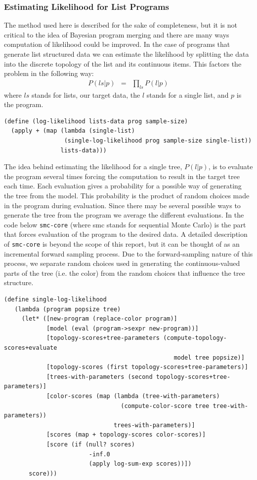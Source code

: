 \documentclass[a4paper,10pt]{article}
\begin{document}
\subsubsection{Estimating Likelihood for List Programs}
The method used here is described for the sake of completeness, but it is not critical to the idea of Bayesian program merging and there are many ways computation of likelihood could be improved.  In the case of programs that generate list structured data we can estimate the likelihood by splitting the data into the discrete topology of the list and its continuous items.  This factors the problem in the following way:
\begin{eqnarray}
P(ls|p) &=& \prod_{ls}P(l|p)
\end{eqnarray}
where $ls$ stands for lists, our target data, the $l$ stands for a single list, and $p$ is the program.
\begin{lstlisting}[frame=trBL]
(define (log-likelihood lists-data prog sample-size)
  (apply + (map (lambda (single-list) 
                 (single-log-likelihood prog sample-size single-list)) 
                lists-data)))
\end{lstlisting}
The idea behind estimating the likelihood for a single tree, $P(l|p)$, is to evaluate the program several times forcing the computation to result in the target tree each time.  Each evaluation gives a probability for a possible way of generating the tree from the model.  This probability is the product of random choices made in the program during evaluation.  Since there may be several possible ways to generate the tree from the program we average the different evaluations.  In the code below \texttt{smc-core} (where smc stands for sequential Monte Carlo) is the part that forces evaluation of the program to the desired data.  A detailed description of \texttt{smc-core} is beyond the scope of this report, but it can be thought of as an incremental forward sampling process.  Due to the forward-sampling nature of this process, we separate random choices used in generating the continuous-valued parts of the tree (i.e. the color) from the random choices that influence the tree structure.
\begin{lstlisting}[frame=trBL]
(define single-log-likelihood 
   (lambda (program popsize tree)
     (let* ([new-program (replace-color program)]
            [model (eval (program->sexpr new-program))]
            [topology-scores+tree-parameters (compute-topology-scores+evaluate 
                                                model tree popsize)]
            [topology-scores (first topology-scores+tree-parameters)]
            [trees-with-parameters (second topology-scores+tree-parameters)]
            [color-scores (map (lambda (tree-with-parameters) 
                                 (compute-color-score tree tree-with-parameters)) 
                               trees-with-parameters)]
            [scores (map + topology-scores color-scores)]
            [score (if (null? scores)
                        -inf.0
                        (apply log-sum-exp scores))])
       score)))
\end{lstlisting}
\end{document}
